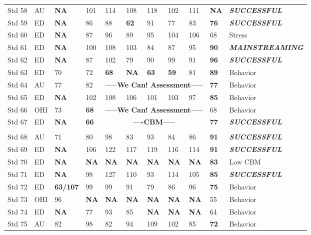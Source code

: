 \documentclass[twoside]{article}
\begin{document}
\begin{tiny}
\begin{landscape}
\begin{longtable}{p{1.5cm}p{1.5cm}p{1.5cm}p{1.5cm}p{1.75cm}p{1.75cm}p{1.75cm}p{1.75cm}p{1.75cm}p{1.75cm}p{2.5cm}@{}}
Std 58 & AU & \textbf{NA} & 101 & 114 & 108 & 118 & 102 & 111 & \textbf{NA} & \textbf{\textit{SUCCESSFUL}}\\
Std 59 & ED & \textbf{NA} & 86 & 88 & \textbf{62} & 91 & 77 & 83 & \textbf{76} & \textbf{\textit{SUCCESSFUL}} \\
Std 60 & ED & \textbf{NA} & 87 & 96 & 89 & 95 & 104 & 106 & 68 & Stress \\
Std 61 & ED & \textbf{NA} & 100 & 108 & 103 & 84 & 87 & 95 & \textbf{90} & \textbf{\textit{MAINSTREAMING}} \\
Std 62 & ED & \textbf{NA} & 87 & 102 & 79 & 90 & 99 & 91 & \textbf{96} & \textbf{\textit{SUCCESSFUL}}\\
Std 63 & ED & 70 & 72 & \textbf{68} & \textbf{NA} & \textbf{63} & \textbf{59} & 81 & \textbf{89} & Behavior\\
Std 64 & AU & 77 & 82 & \multicolumn{5}{c}{\textbf{-----We Can! Assessment-----}} & \textbf{77} & Behavior \\
Std 65 & ED & \textbf{NA} & 102 & 108 & 106 & 101 & 103 & 97 & \textbf{85} & Behavior \\
Std 66 & OHI & 73 & \textbf{68} & \multicolumn{5}{c}{\textbf{-----We Can! Assessment-----}} & 68 & Behavior \\
Std 67 & ED & \textbf{NA} & \textbf{66} & \multicolumn{5}{c}{\textbf{----CBM-----}} & \textbf{77} & \textbf{\textit{SUCCESSFUL}} \\
\hline \\
Std 68 & AU & 71 & 80 & 98 & 83 & 93 & 84 & 86 & \textbf{91} & \textbf{\textit{SUCCESSFUL}}  \\
Std 69 & ED & \textbf{NA} & 106 & 122 & 117 & 119 & 116 & 114 & \textbf{91} & \textbf{\textit{SUCCESSFUL}} \\
Std 70 & ED & \textbf{NA} & \textbf{NA} & \textbf{NA} & \textbf{NA} & \textbf{NA} & \textbf{NA} & \textbf{NA} & \textbf{83} & Low CBM  \\
Std 71 & ED & \textbf{NA} & 98 & 127 & 110 & 93 & 114 & 105 & {\textbf{85}} & \textbf{\textit{SUCCESSFUL}} \\
Std 72 & ED & \textbf{63/107} & 99 & 99 & 91 & 79 & 86 & 96 & \textbf{75} & Behavior  \\
Std 73 & OHI & 96 & \textbf{NA} & \textbf{NA} & \textbf{NA} & \textbf{NA} & \textbf{NA} & \textbf{NA} & 55 & Behavior  \\
Std 74 & ED & \textbf{NA} & 77 & 93 & 85 & \textbf{NA} & \textbf{NA} & \textbf{NA} & 64 & Behavior  \\
Std 75 & AU & 82 & 98 & 82 & 94 & 109 & 102 & 85 & \textbf{72} & Behavior  \\

\end{longtable}
\end{landscape}
\end{tiny}
\end{document}
